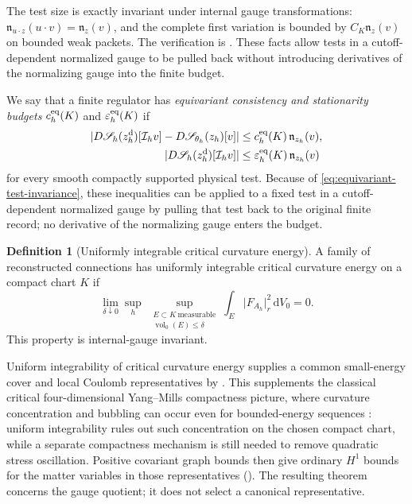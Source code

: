 \documentclass[11pt]{article}
\numberwithin{equation}{section}
\theoremstyle{definition}
\newtheorem{definition}[definition]{Definition}
\theoremstyle{remark}
\newcommand{\dd}{\mathrm d}
\newcommand{\abs}[1]{\lvert#1\rvert}
\newcommand{\Sact}{\mathscr S}
\newcommand{\dV}{\dd V}
\begin{document}
The test size is exactly invariant under internal gauge transformations:
$\mathfrak n_{u\cdot z}(u\cdot v)=\mathfrak n_z(v)$, and the complete
first variation is bounded by $C_K\mathfrak n_z(v)$ on bounded weak packets.
The verification is . These facts allow tests in
a cutoff-dependent normalized gauge to be pulled back without introducing
derivatives of the normalizing gauge into the finite budget.

We say that a finite regulator has \emph{equivariant consistency and
stationarity budgets} $c_h^{\rm eq}(K)$ and
$\varepsilon_h^{\rm eq}(K)$ if
\begin{align}
 \abs{D\Sact_h(z_h^{\rm d})[\mathcal I_hv]
      -D\Sact_{\theta_h}(z_h)[v]}
 &\le c_h^{\rm eq}(K)\,\mathfrak n_{z_h}(v),
 \label{eq:equivariant-consistency}\\
 \abs{D\Sact_h(z_h^{\rm d})[\mathcal I_hv]}
 &\le\varepsilon_h^{\rm eq}(K)\,\mathfrak n_{z_h}(v)
 \label{eq:equivariant-stationarity}
\end{align}
for every smooth compactly supported physical test.  Because of
\eqref{eq:equivariant-test-invariance}, these inequalities can be applied to a
fixed test in a cutoff-dependent normalized gauge by pulling that test back to
the original finite record; no derivative of the normalizing gauge enters the
budget.

\begin{definition}[Uniformly integrable critical curvature energy]
\label{def:critical-curvature-ui}
A family of reconstructed connections has uniformly integrable critical
curvature energy on a compact chart $K$ if
\begin{equation}
 \lim_{\delta\downarrow0}\sup_h\ \sup_{\substack{E\subset K\ \text{measurable}\\
                         \operatorname{vol}_0(E)\le\delta}}
 \int_E\abs{F_{A_h}}_r^2\,\dV_0=0.
 \label{eq:critical-curvature-ui}
\end{equation}
This property is internal-gauge invariant.
\end{definition}

Uniform integrability of critical curvature energy supplies a common
small-energy cover and local Coulomb representatives by
.  This supplements the classical critical
four-dimensional Yang--Mills compactness picture, where curvature
concentration and bubbling can occur even for bounded-energy sequences
\cite{Uhlenbeck1982,Sedlacek1982}: uniform integrability rules out such
concentration on the chosen compact chart, while a separate compactness
mechanism is still needed to remove quadratic stress oscillation.  Positive
covariant graph bounds then give ordinary $H^1$ bounds for the matter
variables in those representatives (). The
resulting theorem concerns the gauge quotient; it does not select a canonical
representative.
\end{document}
